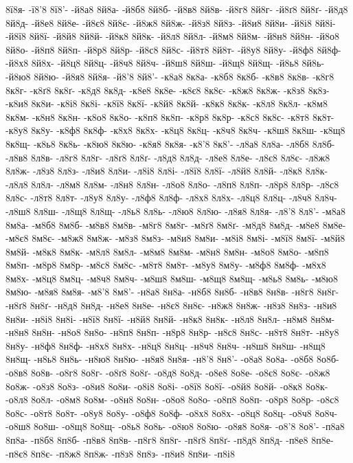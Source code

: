 {8ї8я-
-ї8'8
8ї8'-
-й8а8
8й8а-
-й8б8
8й8б-
-й8в8
8й8в-
-й8г8
8й8г-
-й8ґ8
8й8ґ-
-й8д8
8й8д-
-й8е8
8й8е-
-й8є8
8й8є-
-й8ж8
8й8ж-
-й8з8
8й8з-
-й8и8
8й8и-
-й8і8
8й8і-
-й8ї8
8й8ї-
-й8й8
8й8й-
-й8к8
8й8к-
-й8л8
8й8л-
-й8м8
8й8м-
-й8н8
8й8н-
-й8о8
8й8о-
-й8п8
8й8п-
-й8р8
8й8р-
-й8с8
8й8с-
-й8т8
8й8т-
-й8у8
8й8у-
-й8ф8
8й8ф-
-й8х8
8й8х-
-й8ц8
8й8ц-
-й8ч8
8й8ч-
-й8ш8
8й8ш-
-й8щ8
8й8щ-
-й8ь8
8й8ь-
-й8ю8
8й8ю-
-й8я8
8й8я-
-й8'8
8й8'-
-к8а8
8к8а-
-к8б8
8к8б-
-к8в8
8к8в-
-к8г8
8к8г-
-к8ґ8
8к8ґ-
-к8д8
8к8д-
-к8е8
8к8е-
-к8є8
8к8є-
-к8ж8
8к8ж-
-к8з8
8к8з-
-к8и8
8к8и-
-к8і8
8к8і-
-к8ї8
8к8ї-
-к8й8
8к8й-
-к8к8
8к8к-
-к8л8
8к8л-
-к8м8
8к8м-
-к8н8
8к8н-
-к8о8
8к8о-
-к8п8
8к8п-
-к8р8
8к8р-
-к8с8
8к8с-
-к8т8
8к8т-
-к8у8
8к8у-
-к8ф8
8к8ф-
-к8х8
8к8х-
-к8ц8
8к8ц-
-к8ч8
8к8ч-
-к8ш8
8к8ш-
-к8щ8
8к8щ-
-к8ь8
8к8ь-
-к8ю8
8к8ю-
-к8я8
8к8я-
-к8'8
8к8'-
-л8а8
8л8а-
-л8б8
8л8б-
-л8в8
8л8в-
-л8г8
8л8г-
-л8ґ8
8л8ґ-
-л8д8
8л8д-
-л8е8
8л8е-
-л8є8
8л8є-
-л8ж8
8л8ж-
-л8з8
8л8з-
-л8и8
8л8и-
-л8і8
8л8і-
-л8ї8
8л8ї-
-л8й8
8л8й-
-л8к8
8л8к-
-л8л8
8л8л-
-л8м8
8л8м-
-л8н8
8л8н-
-л8о8
8л8о-
-л8п8
8л8п-
-л8р8
8л8р-
-л8с8
8л8с-
-л8т8
8л8т-
-л8у8
8л8у-
-л8ф8
8л8ф-
-л8х8
8л8х-
-л8ц8
8л8ц-
-л8ч8
8л8ч-
-л8ш8
8л8ш-
-л8щ8
8л8щ-
-л8ь8
8л8ь-
-л8ю8
8л8ю-
-л8я8
8л8я-
-л8'8
8л8'-
-м8а8
8м8а-
-м8б8
8м8б-
-м8в8
8м8в-
-м8г8
8м8г-
-м8ґ8
8м8ґ-
-м8д8
8м8д-
-м8е8
8м8е-
-м8є8
8м8є-
-м8ж8
8м8ж-
-м8з8
8м8з-
-м8и8
8м8и-
-м8і8
8м8і-
-м8ї8
8м8ї-
-м8й8
8м8й-
-м8к8
8м8к-
-м8л8
8м8л-
-м8м8
8м8м-
-м8н8
8м8н-
-м8о8
8м8о-
-м8п8
8м8п-
-м8р8
8м8р-
-м8с8
8м8с-
-м8т8
8м8т-
-м8у8
8м8у-
-м8ф8
8м8ф-
-м8х8
8м8х-
-м8ц8
8м8ц-
-м8ч8
8м8ч-
-м8ш8
8м8ш-
-м8щ8
8м8щ-
-м8ь8
8м8ь-
-м8ю8
8м8ю-
-м8я8
8м8я-
-м8'8
8м8'-
-н8а8
8н8а-
-н8б8
8н8б-
-н8в8
8н8в-
-н8г8
8н8г-
-н8ґ8
8н8ґ-
-н8д8
8н8д-
-н8е8
8н8е-
-н8є8
8н8є-
-н8ж8
8н8ж-
-н8з8
8н8з-
-н8и8
8н8и-
-н8і8
8н8і-
-н8ї8
8н8ї-
-н8й8
8н8й-
-н8к8
8н8к-
-н8л8
8н8л-
-н8м8
8н8м-
-н8н8
8н8н-
-н8о8
8н8о-
-н8п8
8н8п-
-н8р8
8н8р-
-н8с8
8н8с-
-н8т8
8н8т-
-н8у8
8н8у-
-н8ф8
8н8ф-
-н8х8
8н8х-
-н8ц8
8н8ц-
-н8ч8
8н8ч-
-н8ш8
8н8ш-
-н8щ8
8н8щ-
-н8ь8
8н8ь-
-н8ю8
8н8ю-
-н8я8
8н8я-
-н8'8
8н8'-
-о8а8
8о8а-
-о8б8
8о8б-
-о8в8
8о8в-
-о8г8
8о8г-
-о8ґ8
8о8ґ-
-о8д8
8о8д-
-о8е8
8о8е-
-о8є8
8о8є-
-о8ж8
8о8ж-
-о8з8
8о8з-
-о8и8
8о8и-
-о8і8
8о8і-
-о8ї8
8о8ї-
-о8й8
8о8й-
-о8к8
8о8к-
-о8л8
8о8л-
-о8м8
8о8м-
-о8н8
8о8н-
-о8о8
8о8о-
-о8п8
8о8п-
-о8р8
8о8р-
-о8с8
8о8с-
-о8т8
8о8т-
-о8у8
8о8у-
-о8ф8
8о8ф-
-о8х8
8о8х-
-о8ц8
8о8ц-
-о8ч8
8о8ч-
-о8ш8
8о8ш-
-о8щ8
8о8щ-
-о8ь8
8о8ь-
-о8ю8
8о8ю-
-о8я8
8о8я-
-о8'8
8о8'-
-п8а8
8п8а-
-п8б8
8п8б-
-п8в8
8п8в-
-п8г8
8п8г-
-п8ґ8
8п8ґ-
-п8д8
8п8д-
-п8е8
8п8е-
-п8є8
8п8є-
-п8ж8
8п8ж-
-п8з8
8п8з-
-п8и8
8п8и-
-п8і8
}
